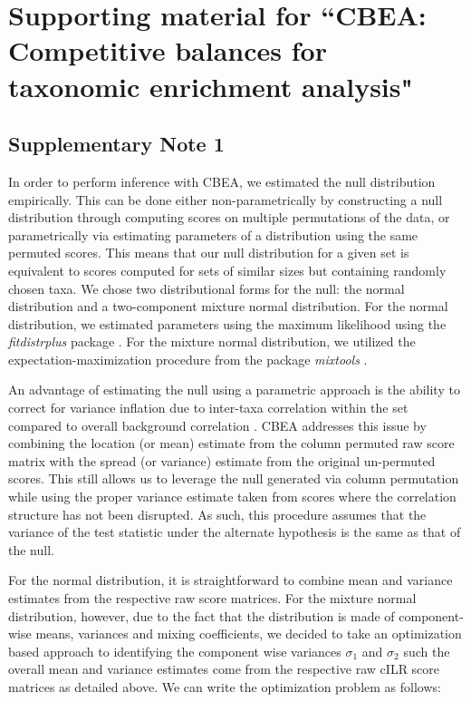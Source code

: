 \chapter{Supporting material for ``CBEA: Competitive balances for taxonomic enrichment analysis"}


\section{Supplementary Note 1} \label{appC_note1}

In order to perform inference with CBEA, we estimated the null distribution empirically. This can be done either non-parametrically by constructing a null distribution through computing scores on multiple permutations of the data, or parametrically via estimating parameters of a distribution using the same permuted scores. This means that our null distribution for a given set is equivalent to scores computed for sets of similar sizes but containing randomly chosen taxa. We chose two distributional forms for the null: the normal distribution and a two-component mixture normal distribution. For the normal distribution, we estimated parameters using the maximum likelihood using the \emph{fitdistrplus} package \cite{delignette-muller2015fitdistrplus}. For the mixture normal distribution, we utilized the expectation-maximization procedure from the package \emph{mixtools} \cite{benaglia2009mixtools}. 

An advantage of estimating the null using a parametric approach is the ability to correct for variance inflation due to inter-taxa correlation within the set compared to overall background correlation \cite{wu2012camera}. CBEA addresses this issue by combining the location (or mean) estimate from the column permuted raw score matrix with the spread (or variance) estimate from the original un-permuted scores. This still allows us to leverage the null generated via column permutation while using the proper variance estimate taken from scores where the correlation structure has not been disrupted. As such, this procedure assumes that the variance of the test statistic under the alternate hypothesis is the same as that of the null.  

For the normal distribution, it is straightforward to combine mean and variance estimates from the respective raw score matrices. For the mixture normal distribution, however, due to the fact that the distribution is made of component-wise means, variances and mixing coefficients, we decided to take an optimization based approach to identifying the component wise variances $\sigma_1$ and $\sigma_2$ such the overall mean and variance estimates come from the respective raw cILR score matrices as detailed above. We can write the optimization problem as follows: 

